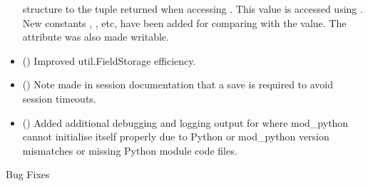 \begin{itemize}
      structure to the tuple returned when accessing .
      This value is accessed using .
      New constants , ,
       etc, have been added for comparing with the
       value. The  attribute
      was also made writable.
    \item
      ()
      Improved util.FieldStorage efficiency.
    \item
      ()
      Note made in session documentation that a save is required to avoid
      session timeouts.
    \item
      ()
      Added additional debugging and logging output for where mod_python
      cannot initialise itself properly due to Python or mod_python version
      mismatches or missing Python module code files.
  \end{itemize}

  Bug Fixes

